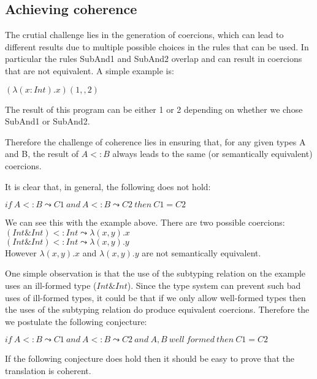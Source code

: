 \documentclass[nocopyrightspace,preprint,times,9pt]{sigplanconf}
\begin{document}
\subsection{Achieving coherence}

The crutial challenge lies in the generation of coercions, which can lead
to different results due to multiple possible choices in the rules that
can be used. In particular the rules SubAnd1 and SubAnd2 overlap and
can result in coercions that are not equivalent. A simple example is:

$(\lambda (x:Int) . x) (1,,2)$

The result of this program can be either 1 or 2 depending on whether
we chose SubAnd1 or SubAnd2.

Therefore the challenge of coherence lies in ensuring that, for any given
types A and B, the result of $A <: B$ always leads to the same (or semantically
equivalent) coercions.

It is clear that, in general, the following does not hold:

$if~A <: B \leadsto C1~and~A <: B \leadsto C2~then~C1 = C2$

We can see this with the example above. There are two possible coercions:\\

\noindent $(Int\&Int) <: Int \leadsto \lambda (x,y). x$\\
$(Int\&Int) <: Int \leadsto \lambda (x,y). y$\\

However $\lambda (x,y). x$ and $\lambda (x,y). y$ are not semantically equivalent.

One simple observation is that the use of the subtyping relation on the
example uses an ill-formed type ($Int\&Int$). Since the type system can prevent
such bad uses of ill-formed types, it could be that if we only allow well-formed
types then the uses of the subtyping relation do produce equivalent coercions.
Therefore the we postulate the following conjecture:

$if~A <: B \leadsto C1~and~A <: B \leadsto C2~and~A, B~well~formed~then~C1 = C2$

If the following conjecture does hold then it should be easy to prove that
the translation is coherent.

\end{document}

